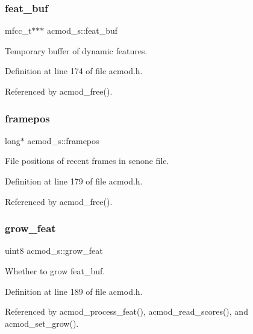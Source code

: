 \mbox{\label{structacmod__s_afc52cc0151f6c7e32a230576141d20a3}} 
\subsubsection{feat\+\_\+buf}
{\footnotesize\ttfamily mfcc\+\_\+t$\ast$$\ast$$\ast$ acmod\+\_\+s\+::feat\+\_\+buf}



Temporary buffer of dynamic features. 



Definition at line 174 of file acmod.\+h.



Referenced by acmod\+\_\+free().

\mbox{\label{structacmod__s_abfd364dafee513f523e1566bb706e48b}} 
\subsubsection{framepos}
{\footnotesize\ttfamily long$\ast$ acmod\+\_\+s\+::framepos}



File positions of recent frames in senone file. 



Definition at line 179 of file acmod.\+h.



Referenced by acmod\+\_\+free().

\mbox{\label{structacmod__s_acbb3fed9495e7b80da79cb03ff3079a1}} 
\subsubsection{grow\+\_\+feat}
{\footnotesize\ttfamily uint8 acmod\+\_\+s\+::grow\+\_\+feat}



Whether to grow feat\+\_\+buf. 



Definition at line 189 of file acmod.\+h.



Referenced by acmod\+\_\+process\+\_\+feat(), acmod\+\_\+read\+\_\+scores(), and acmod\+\_\+set\+\_\+grow().

